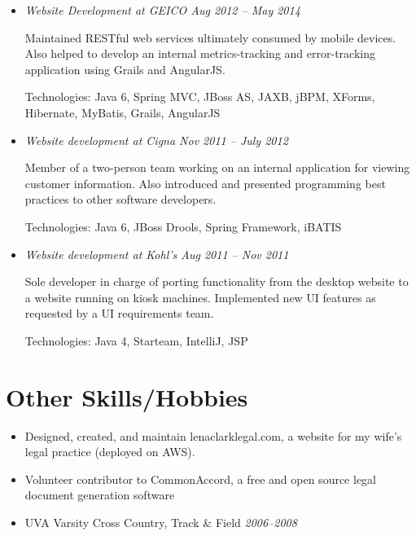 \documentclass[a4paper,11pt]{article}
\begin{document}
  \vskip 5pt
  \begin{itemize}

    \item \textit{Website Development at GEICO \hfill Aug 2012 -- May 2014}

      Maintained RESTful web services ultimately consumed by mobile devices. Also helped to develop
      an internal metrics-tracking and error-tracking application using Grails and AngularJS.

      Technologies: Java 6, Spring MVC, JBoss AS, JAXB, jBPM, XForms, Hibernate, MyBatis, Grails,
      AngularJS

%

    \item \textit{Website development at Cigna \hfill Nov 2011 -- July 2012}

      Member of a two-person team working on an internal application for viewing customer
      information. Also introduced and presented programming best practices to other software
      developers.

      Technologies: Java 6, JBoss Drools, Spring Framework, iBATIS

    \item \textit{Website development at Kohl's \hfill Aug 2011 -- Nov 2011}

      Sole developer in charge of porting functionality from the desktop website to a website
      running on kiosk machines. Implemented new UI features as requested by a UI requirements team.

      Technologies: Java 4, Starteam, IntelliJ, JSP

  \end{itemize}



\vskip 4pt
\section*{Other Skills/Hobbies}
\vskip 5pt

  \begin{itemize}
    \item Designed, created, and maintain lenaclarklegal.com, a website for my wife's legal practice
      (deployed on AWS).
    \item Volunteer contributor to CommonAccord, a free and open source legal document generation
      software
    \item UVA Varsity Cross Country, Track \& Field \hfill \textit{2006--2008}
  \end{itemize}
\end{document}
